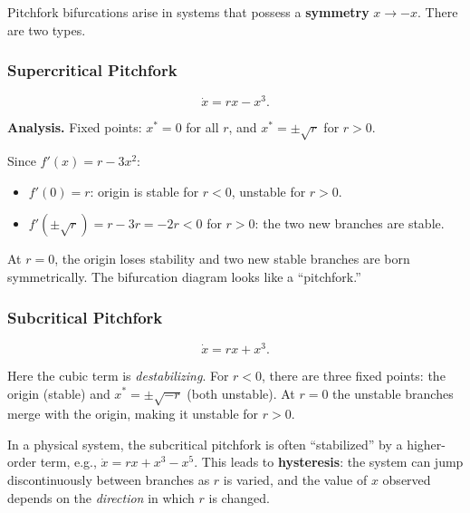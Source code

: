 \documentclass[11pt,letterpaper]{article}
\theoremstyle{definition}
\theoremstyle{plain}
\theoremstyle{remark}
\newcommand{\xdot}{\dot{x}}
\newcommand{\xstar}{x^*}
\begin{document}
Pitchfork bifurcations arise in systems that possess a \textbf{symmetry}
$x\to -x$.  There are two types.

\subsubsection{Supercritical Pitchfork}

\begin{keyresult}
\begin{equation}\label{eq:pf-super}
  \xdot = rx - x^3.
\end{equation}
\end{keyresult}

\noindent\textbf{Analysis.}  Fixed points: $\xstar = 0$ for all $r$, and
$\xstar = \pm\sqrt{r}$ for $r>0$.

Since $f'(x) = r - 3x^2$:
\begin{itemize}[leftmargin=2em]
\item $f'(0) = r$: origin is stable for $r<0$, unstable for $r>0$.
\item $f'(\pm\sqrt{r}) = r - 3r = -2r < 0$ for $r>0$: the two new
      branches are stable.
\end{itemize}

At $r=0$, the origin loses stability and two new stable branches are born
symmetrically.  The bifurcation diagram looks like a ``pitchfork.''

\subsubsection{Subcritical Pitchfork}

\begin{keyresult}
\begin{equation}\label{eq:pf-sub}
  \xdot = rx + x^3.
\end{equation}
\end{keyresult}

Here the cubic term is \emph{destabilizing}.  For $r<0$, there are three
fixed points: the origin (stable) and $\xstar = \pm\sqrt{-r}$ (both unstable).  At $r=0$ the unstable branches merge with the origin, making it
unstable for $r>0$.

\begin{warningbox}
In a physical system, the subcritical pitchfork is often ``stabilized'' by
a higher-order term, e.g., $\xdot = rx + x^3 - x^5$.  This leads to
\textbf{hysteresis}: the system can jump discontinuously between branches as
$r$ is varied, and the value of $x$ observed depends on the
\emph{direction} in which $r$ is changed.
\end{warningbox}
\end{document}

